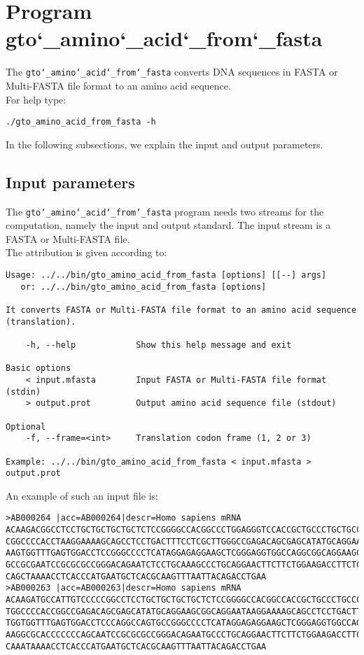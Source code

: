 \section{Program gto\char`_amino\char`_acid\char`_from\char`_fasta}
The \texttt{gto\char`_amino\char`_acid\char`_from\char`_fasta} converts DNA sequences in FASTA or Multi-FASTA file format to an amino acid sequence.\\
For help type:
\begin{lstlisting}
./gto_amino_acid_from_fasta -h
\end{lstlisting}

In the following subsections, we explain the input and output parameters.

\subsection*{Input parameters}

The \texttt{gto\char`_amino\char`_acid\char`_from\char`_fasta} program needs two streams for the computation, namely the input and output standard. The input stream is a FASTA or Multi-FASTA file.\\
The attribution is given according to:
\begin{lstlisting}
Usage: ../../bin/gto_amino_acid_from_fasta [options] [[--] args]
   or: ../../bin/gto_amino_acid_from_fasta [options]

It converts FASTA or Multi-FASTA file format to an amino acid sequence (translation).

    -h, --help            Show this help message and exit

Basic options
    < input.mfasta        Input FASTA or Multi-FASTA file format (stdin)
    > output.prot         Output amino acid sequence file (stdout)

Optional
    -f, --frame=<int>     Translation codon frame (1, 2 or 3)

Example: ../../bin/gto_amino_acid_from_fasta < input.mfasta > output.prot
\end{lstlisting}
An example of such an input file is:
\begin{lstlisting}
>AB000264 |acc=AB000264|descr=Homo sapiens mRNA 
ACAAGACGGCCTCCTGCTGCTGCTGCTCTCCGGGGCCACGGCCCTGGAGGGTCCACCGCTGCCCTGCTGCCATTGTCCC
CGGCCCCACCTAAGGAAAAGCAGCCTCCTGACTTTCCTCGCTTGGGCCGAGACAGCGAGCATATGCAGGAAGCGGCAGG
AAGTGGTTTGAGTGGACCTCCGGGCCCCTCATAGGAGAGGAAGCTCGGGAGGTGGCCAGGCGGCAGGAAGCAGGCCAGT
GCCGCGAATCCGCGCGCCGGGACAGAATCTCCTGCAAAGCCCTGCAGGAACTTCTTCTGGAAGACCTTCTCCACCCCCC
CAGCTAAAACCTCACCCATGAATGCTCACGCAAGTTTAATTACAGACCTGAA
>AB000263 |acc=AB000263|descr=Homo sapiens mRNA 
ACAAGATGCCATTGTCCCCCGGCCTCCTGCTGCTGCTGCTCTCCGGGGCCACGGCCACCGCTGCCCTGCCCCTGGAGGG
TGGCCCCACCGGCCGAGACAGCGAGCATATGCAGGAAGCGGCAGGAATAAGGAAAAGCAGCCTCCTGACTTTCCTCGCT
TGGTGGTTTGAGTGGACCTCCCAGGCCAGTGCCGGGCCCCTCATAGGAGAGGAAGCTCGGGAGGTGGCCAGGCGGCAGG
AAGGCGCACCCCCCCAGCAATCCGCGCGCCGGGACAGAATGCCCTGCAGGAACTTCTTCTGGAAGACCTTCTCCTCCTG
CAAATAAAACCTCACCCATGAATGCTCACGCAAGTTTAATTACAGACCTGAA
\end{lstlisting}

